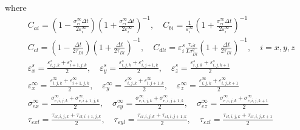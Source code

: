 \documentclass[pdftex,a4paper,parskip,listof=totoc,bibliography=totoc,onehalfspacing,12pt]{scrreprt}
\begin{document}
where
\begin{align*}
  &C_{ai} = \left( 1 - \frac{\sigma^\infty_{ei} \Delta t}{2 \varepsilon^\infty_{i}} \right) \left( 1 + \frac{\sigma^\infty_{ei} \Delta t}{2 \varepsilon^\infty_{i}} \right)^{-1}, \quad
  C_{bi} = \frac{1}{\varepsilon^\infty_{i}} \left( 1 + \frac{\sigma^\infty_{ei} \Delta t}{2 \varepsilon^\infty_{i}} \right)^{-1}\\
  &C_{c l} = \left( 1 - \frac{ \Delta t}{2 \tau_{Dl}} \right) \left( 1 + \frac{ \Delta t}{2 \tau_{Dl}} \right)^{-1}, \quad
  C_{d l i} = \varepsilon^s_{i} \frac{\tau_{\varepsilon i l}}{L \tau_{Dl}^2} \left( 1 + \frac{ \Delta t}{2 \tau_{Dl}} \right)^{-1}, \quad  i = x,y,z\\
  &\varepsilon^s_{x} = \frac{\varepsilon^s_{i,j,k} + \varepsilon^s_{i+1,j,k}}{2}, \quad
  \varepsilon^s_{y} = \frac{\varepsilon^s_{i,j,k} + \varepsilon^s_{i,j+1,k}}{2}, \quad
  \varepsilon^s_{z} = \frac{\varepsilon^s_{i,j,k} + \varepsilon^s_{i,j,k+1}}{2} \\
  &\varepsilon^\infty_{x} = \frac{\varepsilon^\infty_{i,j,k} + \varepsilon^\infty_{i+1,j,k}}{2}, \quad
  \varepsilon^\infty_{y} = \frac{\varepsilon^\infty_{i,j,k} + \varepsilon^\infty_{i,j+1,k}}{2}, \quad
  \varepsilon^\infty_{z} = \frac{\varepsilon^\infty_{i,j,k} + \varepsilon^\infty_{i,j,k+1}}{2} \\
  &\sigma^\infty_{ex} = \frac{\sigma^\infty_{e,i,j,k} + \sigma^\infty_{e,i+1,j,k}}{2}, \quad
  \sigma^\infty_{ey} = \frac{\sigma^\infty_{e,i,j,k} + \sigma^\infty_{e,i,j+1,k}}{2}, \quad
  \sigma^\infty_{ez} = \frac{\sigma^\infty_{e,i,j,k} + \sigma^\infty_{e,i,j,k+1}}{2} \\
  &\tau_{\varepsilon x l} = \frac{\tau_{\varepsilon l ,i,j,k} + \tau_{\varepsilon l ,i+1,j,k}}{2}, \quad
  \tau_{\varepsilon y l} = \frac{\tau_{\varepsilon l ,i,j,k} + \tau_{\varepsilon l ,i,j+1,k}}{2}, \quad
  \tau_{\varepsilon z l} = \frac{\tau_{\varepsilon l ,i,j,k} + \tau_{\varepsilon l ,i,j,k+1}}{2} 
\end{align*}
\end{document}
